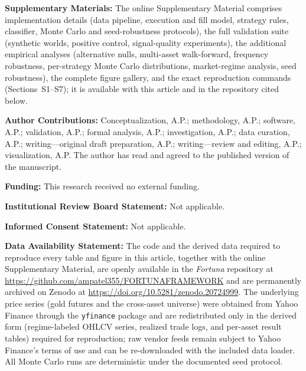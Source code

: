 \documentclass[preprint,12pt]{elsarticle}
\theoremstyle{definition}
\begin{document}
\vspace{10pt}
\noindent\textbf{Supplementary Materials:} The online Supplementary Material comprises implementation details (data pipeline, execution and fill model, strategy rules, classifier, Monte Carlo and seed-robustness protocols), the full validation suite (synthetic worlds, positive control, signal-quality experiments), the additional empirical analyses (alternative nulls, multi-asset walk-forward, frequency robustness, per-strategy Monte Carlo distributions, market-regime analysis, seed robustness), the complete figure gallery, and the exact reproduction commands (Sections~S1--S7); it is available with this article and in the repository cited below.

\vspace{4pt}
\noindent\textbf{Author Contributions:} Conceptualization, A.P.; methodology, A.P.; software, A.P.; validation, A.P.; formal analysis, A.P.; investigation, A.P.; data curation, A.P.; writing---original draft preparation, A.P.; writing---review and editing, A.P.; visualization, A.P. The author has read and agreed to the published version of the manuscript.

\vspace{4pt}
\noindent\textbf{Funding:} This research received no external funding.

\vspace{4pt}
\noindent\textbf{Institutional Review Board Statement:} Not applicable.

\vspace{4pt}
\noindent\textbf{Informed Consent Statement:} Not applicable.

\vspace{4pt}
\noindent\textbf{Data Availability Statement:} The code and the derived data required to reproduce every table and figure in this article, together with the online Supplementary Material, are openly available in the \emph{Fortuna} repository at \url{https://github.com/ampatel355/FORTUNAFRAMEWORK} and are permanently archived on Zenodo at \url{https://doi.org/10.5281/zenodo.20724999}. The underlying price series (gold futures and the cross-asset universe) were obtained from Yahoo Finance through the \texttt{yfinance} package and are redistributed only in the derived form (regime-labeled OHLCV series, realized trade logs, and per-asset result tables) required for reproduction; raw vendor feeds remain subject to Yahoo Finance's terms of use and can be re-downloaded with the included data loader. All Monte Carlo runs are deterministic under the documented seed protocol.
\end{document}
